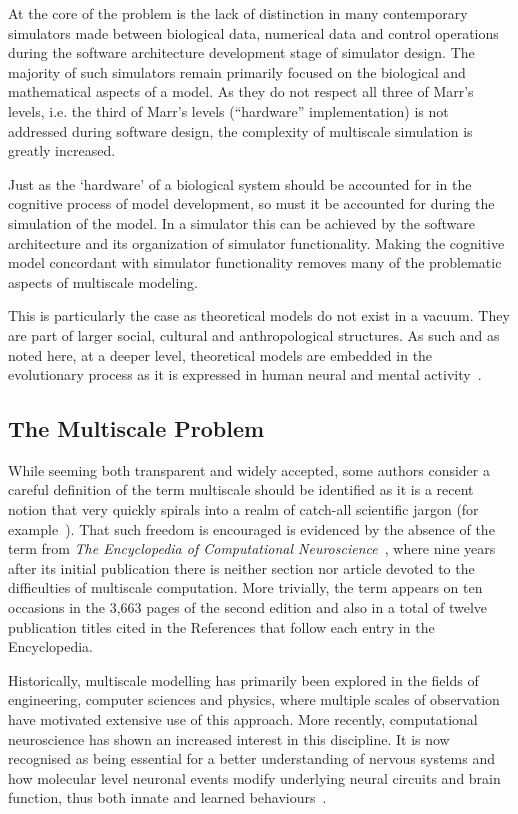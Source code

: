 \documentclass[10pt,letterpaper]{article}
\begin{document}
At the core of the problem is the lack of distinction in many contemporary simulators made between biological data, numerical data and control operations during the software architecture development stage of simulator design. The majority of such simulators remain primarily focused on the biological and mathematical aspects of a model. As they do not respect all three of Marr's levels, i.e. the third of Marr's levels (``hardware'' implementation) is not addressed during software design, the complexity of multiscale simulation is greatly increased.

Just as the `hardware' of a biological system should be accounted for in the cognitive process of model development, so must it be accounted for during the simulation of the model. In a simulator this can be achieved by the software architecture and its organization of simulator functionality. Making the cognitive model concordant with simulator functionality removes many of the problematic aspects of multiscale modeling.

This is particularly the case as theoretical models do not exist in a vacuum. They are part of larger social, cultural and anthropological structures. As such and as noted here, at a deeper level, theoretical models are embedded in the evolutionary process as it is expressed in human neural and mental activity~\cite{jacobson93}.

\subsection*{The Multiscale Problem}

While seeming both transparent and widely accepted, some authors consider a careful definition of the term multiscale should be identified as it is a recent notion that very quickly spirals into a realm of catch-all scientific jargon (for example~\cite{walpole13}). That such freedom is encouraged is evidenced by the absence of the term from \textit{The Encyclopedia of Computational Neuroscience}~\cite{jung22}, where nine years after its initial publication there is neither section nor article devoted to the difficulties of multiscale computation. More trivially, the term appears on ten occasions in the 3,663 pages of the second edition and also in a total of twelve publication titles cited in the References that follow each entry in the Encyclopedia.

Historically, multiscale modelling has primarily been explored in the fields of engineering, computer sciences and physics, where multiple scales of observation have motivated extensive use of this approach. More recently, computational neuroscience has shown an increased interest in this discipline. It is now recognised as being essential for a better understanding of nervous systems and how molecular level neuronal events modify underlying neural circuits and brain function, thus both innate and learned behaviours~\cite{bouteiller11}.
\end{document}
